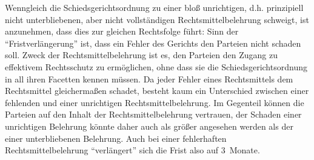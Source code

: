 Wenngleich die Schiedsgerichtsordnung zu einer bloß unrichtigen, d.h. prinzipiell nicht unterbliebenen, aber nicht vollständigen Rechtsmittelbelehrung schweigt, ist anzunehmen, dass dies zur gleichen Rechtsfolge führt: Sinn der \enquote{Fristverlängerung} ist, dass ein Fehler des Gerichts den Parteien nicht schaden soll. Zweck der Rechtsmittelbelehrung ist es, den Parteien den Zugang zu effektivem Rechtsschutz zu ermöglichen, ohne dass sie die Schiedsgerichtsordnung in all ihren Facetten kennen müssen. Da jeder Fehler eines Rechtsmittels dem Rechtsmittel gleichermaßen schadet, besteht kaum ein Unterschied zwischen einer fehlenden und einer unrichtigen Rechtsmittelbelehrung. Im Gegenteil können die Parteien auf den Inhalt der Rechtsmittelbelehrung vertrauen, der Schaden einer unrichtigen Belehrung könnte daher auch als größer angesehen werden als der einer unterbliebenen Belehrung. Auch bei einer fehlerhaften Rechtsmittelbelehrung \enquote{verlängert} sich die Frist also auf 3~Monate.

